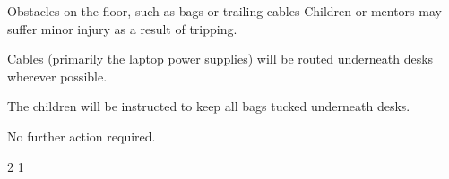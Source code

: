 {    \risk
        {Obstacles on the floor, such as bags or trailing cables}
        {Children or mentors may suffer minor injury as a result of tripping.}
        {\item Cables (primarily the laptop power supplies) will be routed
         underneath desks wherever possible.
         \item The children will be instructed to keep all bags tucked underneath
         desks.}
        {\item No further action required.}
        {2} %
        {1} %
}



